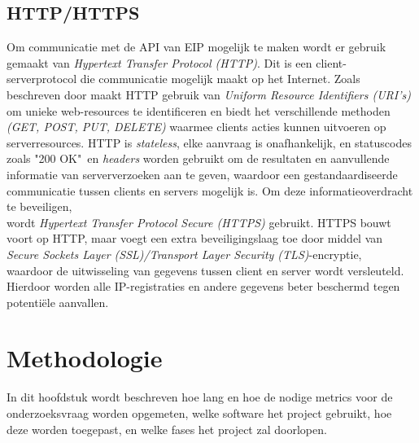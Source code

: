 \documentclass{hogent-article}
\begin{document}
\subsection{HTTP/HTTPS}
Om communicatie met de API van EIP mogelijk te maken wordt er gebruik gemaakt van \textit{Hypertext Transfer Protocol (HTTP)}. Dit is een client-serverprotocol die communicatie mogelijk maakt op het Internet. Zoals beschreven door \textcite{Fielding2014} maakt HTTP gebruik van \textit{Uniform Resource Identifiers (URI's)} om unieke web-resources te identificeren en biedt het verschillende methoden \textit{(GET, POST, PUT, DELETE)} waarmee clients acties kunnen uitvoeren op serverresources. HTTP is \textit{stateless}, elke aanvraag is onafhankelijk, en statuscodes zoals "200 OK"\ en \textit{headers} worden gebruikt om de resultaten en aanvullende informatie van serververzoeken aan te geven, waardoor een gestandaardiseerde communicatie tussen clients en servers mogelijk is.
Om deze informatieoverdracht te beveiligen, \\wordt \textit{Hypertext Transfer Protocol Secure (HTTPS)} gebruikt. HTTPS bouwt voort op HTTP, maar voegt een extra beveiligingslaag toe door middel van \textit{Secure Sockets Layer (SSL)/Transport Layer Security (TLS)}-encryptie, \\waardoor de uitwisseling van gegevens tussen client en server wordt versleuteld. Hierdoor worden alle IP-registraties en andere gegevens beter beschermd tegen potentiële aanvallen.

\section{Methodologie}
\label{sec:methodologie}
In dit hoofdstuk wordt beschreven hoe lang en hoe de nodige metrics voor de onderzoeksvraag worden opgemeten, welke software het project gebruikt, hoe deze worden toegepast, en welke fases het project zal doorlopen.
\end{document}
